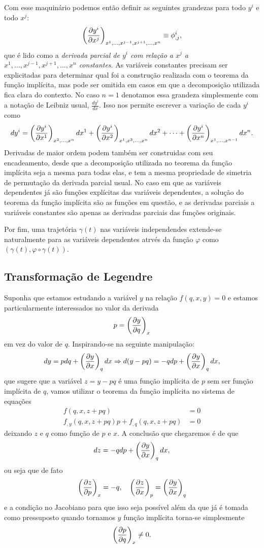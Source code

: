 Com esse maquinário podemos então definir as seguintes grandezas para todo $y^i$
e todo $x^j$:
$$\pd{y^i}{x^j}{x^1,\dots,x^{j-1},x^{j+1},\dots,x^n}\equiv\phi^i_{,j},$$
que é lido como a \emph{derivada parcial de $y^i$ com relação a $x^j$ a $x^1,
\dots,x^{j-1},x^{j+1} ,\dots,x^n$ constantes}. As variáveis constantes precisam
ser explicitadas para determinar qual foi a construção realizada com o teorema
da função implícita, mas pode ser omitida em casos em que a decomposição
utilizada fica clara do contexto. No caso $n=1$ denotamos essa grandeza
simplesmente com a notação de Leibniz usual, $\frac{dy^i}{dx}$. Isso nos permite
escrever a variação de cada $y^i$ como
$$dy^i=\pd{y^i}{x^1}{x^2,\dots,x^n}dx^1+\pd{y^i}{x^2}{x^1,x^3,\dots,x^n}dx^2
+\cdots+\pd{y^i}{x^n}{x^1,\dots,x^{n-1}}dx^n.$$
Derivadas de maior ordem podem também ser construidas com seu encadeamento,
desde que a decomposição utilizada no teorema da função implícita seja a mesma
para todas elas, e tem a mesma propriedade de simetria de permutação da derivada
parcial usual. No caso em que as variáveis dependentes já são funções explícitas
das variáveis dependentes, a solução do teorema da função implícita são as
funções em questão, e as derivadas parciais a variáveis constantes são apenas as
derivadas parciais das funções originais.

Por fim, uma trajetória $\gamma(t)$ nas variáveis independendes extende-se
naturalmente para as variáveis dependentes atrvés da função $\varphi$ como 
$(\gamma(t), \varphi\circ\gamma(t))$.

\subsection{Transformação de Legendre}

Suponha que estamos estudando a variável $y$ na relação $f(q,x,y)=0$ e estamos
particularmente interessados no valor da derivada 
$$p=\pd{y}{q}{x}$$
em vez do valor de $q$. Inspirando-se na seguinte manipulação:
$$dy=pdq+\pd{y}{x}{q}dx\Rightarrow d(y-pq)=-qdp+\pd{y}{x}{q}dx,$$
que sugere que a variável $z=y-pq$ é uma função implícita de $p$ sem ser função
implícita de $q$, vamos utilizar o teorema da função implícita no sistema de
equações
\begin{align*}
    f(q,x,z+pq)&=0\\
    f_{,y}(q,x,z+pq)p+f_{,q}(q,x,z+pq)&=0
\end{align*}
deixando $z$ e $q$ como função de $p$ e $x$. A conclusão que chegaremos é de que
$$dz=-qdp+\pd{y}{x}{q}dx,$$
ou seja que de fato
$$\pd{z}{p}{x}=-q,\quad\pd{z}{x}{p}=\pd{y}{x}{q}$$
e a condição no Jacobiano para que isso seja possível além da que já é tomada
como pressuposto quando tornamos $y$ função implícita torna-se simplesmente
$$\pd{p}{q}{x}\neq0.$$

